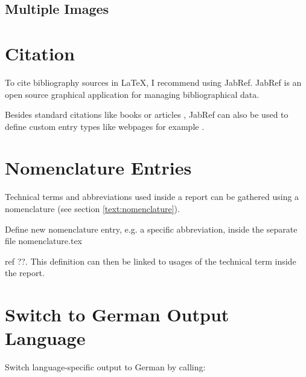 \subsection{Multiple Images}




\section{Citation}

To cite bibliography sources in LaTeX, I recommend using JabRef. 
JabRef is an open source graphical application for managing bibliographical data.

Besides standard citations like books \cite{2000_Kuffel_HV_engineering_fundamentals} or articles \cite{2004_Whitesides_writing_a_paper}, JabRef can also be used to define custom entry types like webpages for example \cite{2015_github_webpage}.


\section{Nomenclature Entries}

Technical terms and abbreviations used inside a report can be gathered using a nomenclature (see section \ref{text:nomenclature}).

Define new nomenclature entry, e.g. a specific abbreviation, inside the separate file nomenclature.tex 

ref ??.
This definition can then be linked to usages of the technical term inside the report.

%


\section{Switch to German Output Language}

Switch language-specific output to German by calling:



